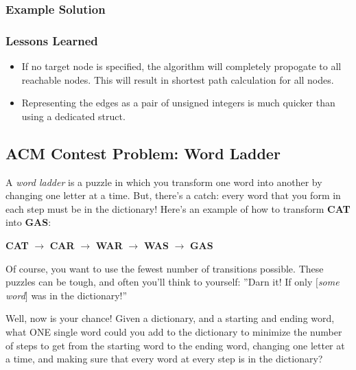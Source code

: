 \subsubsection{Example Solution}

\subsubsection{Lessons Learned}
\begin{itemize}
	\item If no target node is specified, the algorithm will completely propogate to all reachable nodes.
		This will result in shortest path calculation for all nodes.
	\item Representing the edges as a pair of unsigned integers is much quicker than using a dedicated struct.
\end{itemize}

\subsection{ACM Contest Problem: Word Ladder\cite{acmsoutheastregional2014}}
A \textit{word ladder} is a puzzle in which you transform one word into another by changing one letter at a time.
But, there's a catch: every word that you form in each step must be in the dictionary!
Here's an example of how to transform \textbf{CAT} into \textbf{GAS}:

\vspace{0.15in}

\begin{center}
\textbf{CAT} $\to$ \textbf{CAR} $\to$ \textbf{WAR} $\to$ \textbf{WAS} $\to$ \textbf{GAS}
\end{center}

\vspace{0.15in}

Of course, you want to use the fewest number of transitions possible.
These puzzles can be tough, and often you'll think to yourself:
''Darn it! If only $[$\textit{some word}$]$ was in the dictionary!''

Well, now is your chance!
Given a dictionary, and a starting and ending word, what ONE single word could you add to the dictionary to minimize the number of steps to get from the starting word to the ending word, changing one letter at a time, and making sure that every word at every step is in the dictionary?

